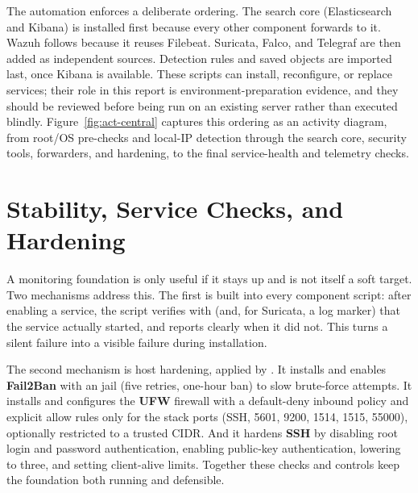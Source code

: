 The automation enforces a deliberate ordering. The search core (Elasticsearch and Kibana) is installed first because every other component forwards to it. Wazuh follows because it reuses Filebeat. Suricata, Falco, and Telegraf are then added as independent sources. Detection rules and saved objects are imported last, once Kibana is available. These scripts can install, reconfigure, or replace services; their role in this report is environment-preparation evidence, and they should be reviewed before being run on an existing server rather than executed blindly. Figure~\ref{fig:act-central} captures this ordering as an activity diagram, from root/OS pre-checks and local-IP detection through the search core, security tools, forwarders, and hardening, to the final service-health and telemetry checks.


\section{Stability, Service Checks, and Hardening}
\label{sec:stability}

A monitoring foundation is only useful if it stays up and is not itself a soft target. Two mechanisms address this. The first is built into every component script: after enabling a service, the script verifies with  (and, for Suricata, a log marker) that the service actually started, and reports clearly when it did not. This turns a silent failure into a visible failure during installation.

The second mechanism is host hardening, applied by . It installs and enables \textbf{Fail2Ban} with an  jail (five retries, one-hour ban) to slow brute-force attempts. It installs and configures the \textbf{UFW} firewall with a default-deny inbound policy and explicit allow rules only for the stack ports (SSH, 5601, 9200, 1514, 1515, 55000), optionally restricted to a trusted CIDR. And it hardens \textbf{SSH} by disabling root login and password authentication, enabling public-key authentication, lowering  to three, and setting client-alive limits. Together these checks and controls keep the foundation both running and defensible.

